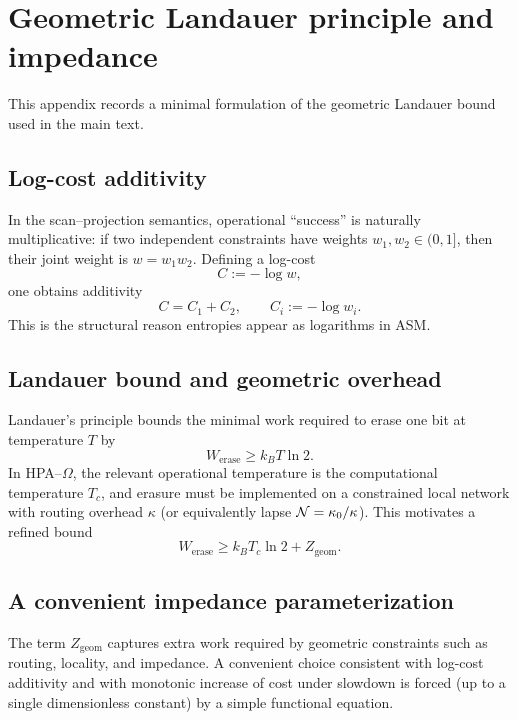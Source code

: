 \section{Geometric Landauer principle and impedance}
\label{app:geometric_landauer}

This appendix records a minimal formulation of the geometric Landauer bound used in the main text.

\subsection{Log-cost additivity}

In the scan--projection semantics, operational ``success'' is naturally multiplicative: if two independent constraints have weights $w_1,w_2\in(0,1]$, then their joint weight is $w=w_1 w_2$. Defining a log-cost
\begin{equation}
C:=-\log w,
\end{equation}
one obtains additivity
\begin{equation}
C = C_1 + C_2,\qquad C_i:=-\log w_i.
\end{equation}
This is the structural reason entropies appear as logarithms in ASM.

\subsection{Landauer bound and geometric overhead}

Landauer's principle bounds the minimal work required to erase one bit at temperature $T$ by \cite{Landauer1961,Bennett1973}
\begin{equation}
W_{\mathrm{erase}} \ge k_B T \ln 2.
\end{equation}
In HPA--$\Omega$, the relevant operational temperature is the computational temperature $T_c$, and erasure must be implemented on a constrained local network with routing overhead $\kappa$ (or equivalently lapse $\mathcal{N}=\kappa_0/\kappa$). This motivates a refined bound
\begin{equation}
W_{\mathrm{erase}} \ge k_B T_c \ln 2 + Z_{\mathrm{geom}}.
\end{equation}

\subsection{A convenient impedance parameterization}

The term $Z_{\mathrm{geom}}$ captures extra work required by geometric constraints such as routing, locality, and impedance.
A convenient choice consistent with log-cost additivity and with monotonic increase of cost under slowdown is forced (up to a single dimensionless constant) by a simple functional equation.

